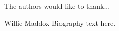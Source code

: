 \documentclass[12pt,journal,compsoc]{IEEEtran}
\begin{document}
The authors would like to thank...


\ifCLASSOPTIONcaptionsoff
  \newpage
\fi





%

% 

\begin{IEEEbiography}{Willie Maddox}
Biography text here.
\end{IEEEbiography}

\end{document}
